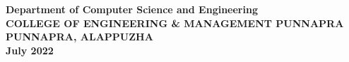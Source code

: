 \begin{titlepage}
\begin{center}
		\textbf{Department of Computer Science and Engineering}\\[0.2cm]
		\textbf{COLLEGE OF ENGINEERING \& MANAGEMENT PUNNAPRA}\\[0.2cm]
		\textbf{PUNNAPRA, ALAPPUZHA}\\[0.2cm]
		\textbf{July 2022}\\
	\end{center}
\end{titlepage}




